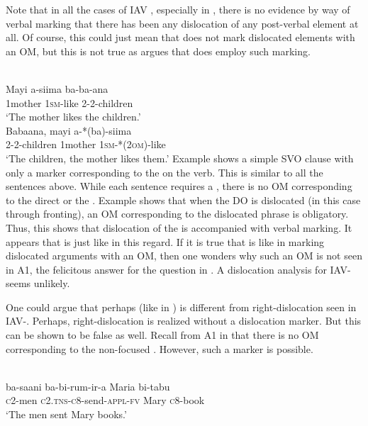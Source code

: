 \documentclass[output=paper,newtxmath,modfonts,nonflat,hidelinks]{langsci/langscibook}
\begin{document}
Note that in all the cases of IAV , especially in , there is no evidence by way of verbal marking that there has been any dislocation of any post-verbal element at all. Of course, this could just mean that  does not mark dislocated elements with an OM, but this is not true as \citet{Sikuku2012} argues that  does employ such marking.

\ea\label{ex:selvanathan:8}
 \citep[8]{Sikuku2012}\\
\ea\label{ex:selvanathan:8a}
\gll Mayi     a-siima   ba-ba-ana\\
1mother   \textsc{1sm}{}-like   2-2-children \\
\glt `The mother likes the children.' \\

\ex\label{ex:selvanathan:8b}
\gll Babaana,   mayi     a-*(ba)-siima\\
	2-2-children   1mother   \textsc{1sm}{}-*(\textsc{2om})-like \\
\glt `The children, the mother likes them.' 
\z
\z
Example  shows a simple SVO clause with only a marker corresponding to the  on the verb. This is similar to all the  sentences above. While each sentence requires a , there is no OM corresponding to the direct or the . Example  shows that when the DO is dislocated (in this case through fronting), an OM corresponding to the dislocated phrase is obligatory. Thus, this shows that dislocation of the  is accompanied with verbal marking. It appears that  is just like  in this regard. If it is true that  is like  in marking dislocated arguments with an OM, then one wonders why such an OM is not seen in A1, the felicitous answer for the question in . A dislocation analysis for  IAV- seems unlikely. 

One could argue that perhaps  (like in ) is different from right-dislocation seen in IAV-. Perhaps, right-dislocation is realized without a dislocation marker. But this can be shown to be false as well. Recall from A1 in  that there is no OM corresponding to the non-focused . However, such a marker is possible. 

\ea\label{ex:selvanathan:9}
\\
{\gll ba-saani    ba-bi-rum-ir-a           Maria   bi-tabu     \\
\textsc{c}2-men      \textsc{c}2.\textsc{tns}{}-\textsc{c}8-send-\textsc{appl}{}-\textsc{fv}  Mary     \textsc{c}8-book  \\}
\glt `The men sent Mary books.'
\z
\end{document}
